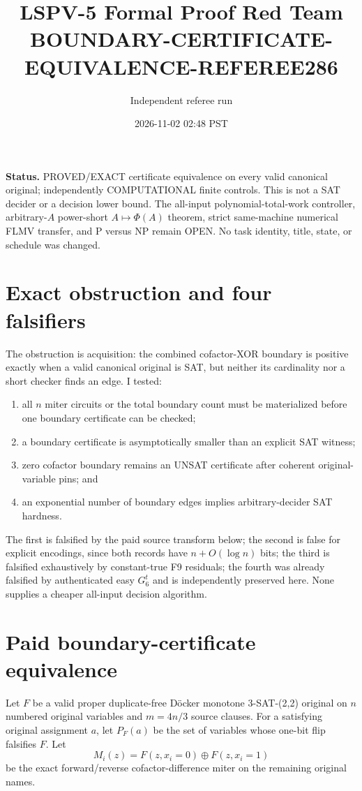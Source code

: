 \documentclass[11pt]{article}
\title{LSPV-5 Formal Proof Red Team\\BOUNDARY-CERTIFICATE-EQUIVALENCE-REFEREE286}
\author{Independent referee run}
\date{2026-11-02 02:48 PST}
\begin{document}
\maketitle

\noindent\textbf{Status.} PROVED/EXACT certificate equivalence on every valid canonical original; independently COMPUTATIONAL finite controls. This is not a SAT decider or a decision lower bound. The all-input polynomial-total-work controller, arbitrary-$A$ power-short $A\mapsto\Phi(A)$ theorem, strict same-machine numerical FLMV transfer, and P versus NP remain OPEN. No task identity, title, state, or schedule was changed.

\section{Exact obstruction and four falsifiers}
The obstruction is acquisition: the combined cofactor-XOR boundary is positive exactly when a valid canonical original is SAT, but neither its cardinality nor a short checker finds an edge. I tested:
\begin{enumerate}
\item all $n$ miter circuits or the total boundary count must be materialized before one boundary certificate can be checked;
\item a boundary certificate is asymptotically smaller than an explicit SAT witness;
\item zero cofactor boundary remains an UNSAT certificate after coherent original-variable pins; and
\item an exponential number of boundary edges implies arbitrary-decider SAT hardness.
\end{enumerate}
The first is falsified by the paid source transform below; the second is false for explicit encodings, since both records have $n+O(\log n)$ bits; the third is falsified exhaustively by constant-true F9 residuals; the fourth was already falsified by authenticated easy $G_6^t$ and is independently preserved here. None supplies a cheaper all-input decision algorithm.

\section{Paid boundary-certificate equivalence}
Let $F$ be a valid proper duplicate-free D\"ocker monotone 3-SAT-(2,2) original on $n$ numbered original variables and $m=4n/3$ source clauses. For a satisfying original assignment $a$, let $P_F(a)$ be the set of variables whose one-bit flip falsifies $F$. Let
\[
 M_i(z)=F(z,x_i=0)\oplus F(z,x_i=1)
\]
be the exact forward/reverse cofactor-difference miter on the remaining original names.
\end{document}
